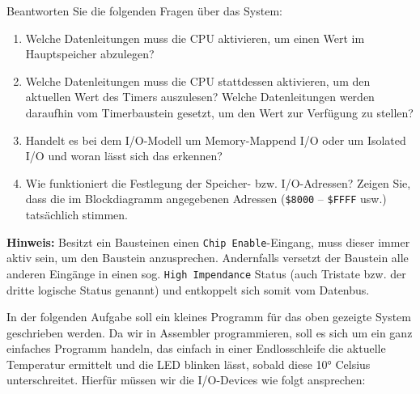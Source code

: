 Beantworten Sie die folgenden Fragen über das System:

\begin{enumerate}
    \item Welche Datenleitungen muss die CPU aktivieren, um einen Wert im
    Hauptspeicher abzulegen?

    \item Welche Datenleitungen muss die CPU stattdessen aktivieren, um den
    aktuellen Wert des Timers auszulesen? Welche Datenleitungen werden daraufhin
    vom Timerbaustein gesetzt, um den Wert zur Verfügung zu stellen?

    \item Handelt es bei dem I/O-Modell um \glqq{}Memory-Mappend I/O\grqq{}
    oder um \glqq{}Isolated I/O\grqq{} und woran lässt sich das erkennen?

    \item Wie funktioniert die Festlegung der Speicher- bzw. I/O-Adressen?
    Zeigen Sie, dass die im Blockdiagramm angegebenen Adressen
    (\texttt{\$8000} -- \texttt{\$FFFF} usw.) tatsächlich stimmen.
\end{enumerate}

\textbf{Hinweis:} Besitzt ein Bausteinen einen \texttt{Chip Enable}-Eingang,
muss dieser immer aktiv sein, um den Baustein anzusprechen. Andernfalls versetzt
der Baustein alle anderen Eingänge in einen sog. \texttt{High Impendance} Status
(auch Tristate bzw. der dritte logische Status genannt) und entkoppelt sich somit
vom Datenbus.


In der folgenden Aufgabe soll ein kleines Programm für das oben gezeigte
System geschrieben werden. Da wir in Assembler programmieren, soll es sich
um ein ganz einfaches Programm handeln, das einfach in einer Endlosschleife
die aktuelle Temperatur ermittelt und die LED blinken lässt, sobald diese
10° Celsius unterschreitet. Hierfür müssen wir die I/O-Devices wie folgt
ansprechen:


